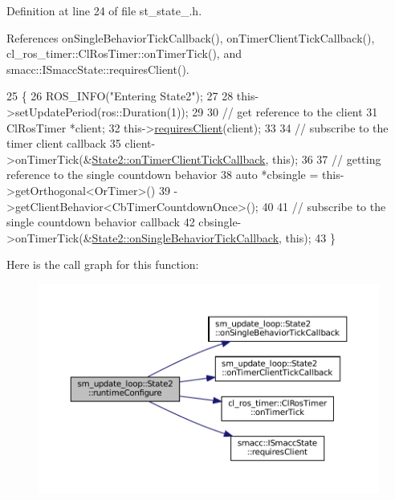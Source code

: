 Definition at line 24 of file st\+\_\+state\+\_.\+h.



References on\+Single\+Behavior\+Tick\+Callback(), on\+Timer\+Client\+Tick\+Callback(), cl\+\_\+ros\+\_\+timer\+::\+Cl\+Ros\+Timer\+::on\+Timer\+Tick(), and smacc\+::\+I\+Smacc\+State\+::requires\+Client().


\begin{DoxyCode}
25     \{
26         ROS\_INFO(\textcolor{stringliteral}{"Entering State2"});
27 
28         this->setUpdatePeriod(ros::Duration(1));
29 
30         \textcolor{comment}{// get reference to the client}
31         ClRosTimer *client;
32         this->\hyperlink{classsmacc_1_1ISmaccState_a7f95c9f0a6ea2d6f18d1aec0519de4ac}{requiresClient}(client);
33 
34         \textcolor{comment}{// subscribe to the timer client callback}
35         client->onTimerTick(&\hyperlink{structsm__update__loop_1_1State2_a6de20c89117e60923ba556bedeb0d231}{State2::onTimerClientTickCallback}, \textcolor{keyword}{this});
36 
37         \textcolor{comment}{// getting reference to the single countdown behavior}
38         \textcolor{keyword}{auto} *cbsingle = this->getOrthogonal<OrTimer>()
39                              ->getClientBehavior<CbTimerCountdownOnce>();
40 
41         \textcolor{comment}{// subscribe to the single countdown behavior callback}
42         cbsingle->onTimerTick(&\hyperlink{structsm__update__loop_1_1State2_ab3e5ab2f3afd27d1550dda7f4e09b6fb}{State2::onSingleBehaviorTickCallback}, \textcolor{keyword}{
      this});
43     \}
\end{DoxyCode}
Here is the call graph for this function\+:
\nopagebreak
\begin{figure}[H]
\begin{center}
\leavevmode
\includegraphics[width=350pt]{structsm__update__loop_1_1State2_ad817c7ed319628e2794a05bb6aa10921_cgraph}
\end{center}
\end{figure}
\mbox{\label{structsm__update__loop_1_1State2_a1def7d74eb295ef6fdfdd122affa921d}} 

